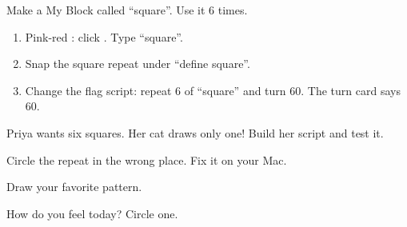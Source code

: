 \begin{exercise}
Make a My Block called \enquote{square}. Use it 6 times.
\begin{enumerate}[leftmargin=1.4em,itemsep=2pt]
  \item Pink-red : click . Type \enquote{square}.
  \item Snap the square repeat under \enquote{define square}.
  \item Change the flag script: repeat 6 of \enquote{square} and turn 60. The turn card says 60.
\end{enumerate}
\begin{center}
\begin{scratch}[scale=0.8]
\end{scratch}
\qquad
\begin{scratch}[scale=0.8]
\end{scratch}
\end{center}
\end{exercise}

\begin{exercise}
Priya wants six squares. Her cat draws only one! Build her script and test it.
\begin{center}
\begin{scratch}[scale=0.8]
\end{scratch}
\end{center}
Circle the repeat in the wrong place. Fix it on your Mac.
\end{exercise}

\begin{vocab}
\end{vocab}

\begin{reflection}
Draw your favorite pattern.
\answerspace{4cm}

How do you feel today? Circle one.

\begin{center}
\Huge\faSmile[regular]\qquad\faMeh[regular]\qquad\faFrown[regular]
\end{center}
\end{reflection}

